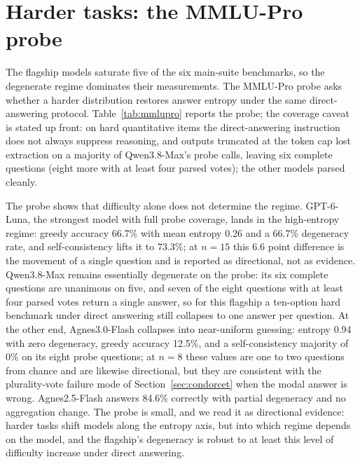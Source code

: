 \section{Harder tasks: the MMLU-Pro probe}
\setcounter{table}{0}
\label{app:mmlupro}
\label{sec:mmlupro}

The flagship models saturate five of the six main-suite benchmarks, so the degenerate regime dominates their measurements. The MMLU-Pro probe asks whether a harder distribution restores answer entropy under the same direct-answering protocol. Table~\ref{tab:mmlupro} reports the probe; the coverage caveat is stated up front: on hard quantitative items the direct-answering instruction does not always suppress reasoning, and outputs truncated at the token cap lost extraction on a majority of Qwen3.8-Max's probe calls, leaving six complete questions (eight more with at least four parsed votes); the other models parsed cleanly.

\begin{table}[htbp]
\centering
\footnotesize
\caption{MMLU-Pro probe: greedy accuracy, single-sample accuracy S1, and SC-6 accuracy, with mean support-normalized sample entropy, sample degeneracy rate, and the model's main-suite entropy for comparison.}
\label{tab:mmlupro}

\end{table}

The probe shows that difficulty alone does not determine the regime. GPT-6-Luna, the strongest model with full probe coverage, lands in the high-entropy regime: greedy accuracy 66.7\% with mean entropy 0.26 and a 66.7\% degeneracy rate, and self-consistency lifts it to 73.3\%; at $n = 15$ this 6.6 point difference is the movement of a single question and is reported as directional, not as evidence. Qwen3.8-Max remains essentially degenerate on the probe: its six complete questions are unanimous on five, and seven of the eight questions with at least four parsed votes return a single answer, so for this flagship a ten-option hard benchmark under direct answering still collapses to one answer per question. At the other end, Agnes3.0-Flash collapses into near-uniform guessing: entropy 0.94 with zero degeneracy, greedy accuracy 12.5\%, and a self-consistency majority of 0\% on its eight probe questions; at $n = 8$ these values are one to two questions from chance and are likewise directional, but they are consistent with the plurality-vote failure mode of Section~\ref{sec:condorcet} when the modal answer is wrong. Agnes2.5-Flash answers 84.6\% correctly with partial degeneracy and no aggregation change. The probe is small, and we read it as directional evidence: harder tasks shift models along the entropy axis, but into which regime depends on the model, and the flagship's degeneracy is robust to at least this level of difficulty increase under direct answering.

